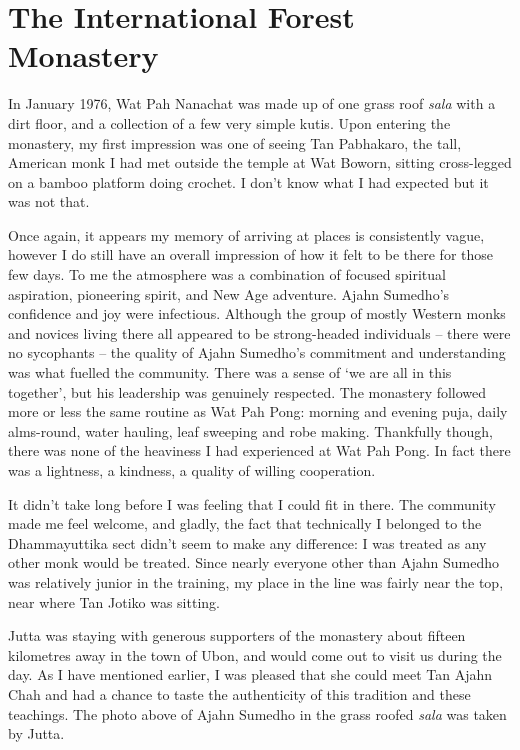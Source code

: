 \chapter{The International Forest Monastery}

In January 1976, Wat Pah Nanachat was made up of one grass roof
\emph{sala} with a dirt floor, and a collection of a few very simple
kutis. Upon entering the monastery, my first impression was one of
seeing Tan Pabhakaro, the tall, American monk I had met outside the
temple at Wat Boworn, sitting cross-legged on a bamboo platform doing
crochet. I don't know what I had expected but it was not that.

Once again, it appears my memory of arriving at places is consistently
vague, however I do still have an overall impression of how it felt to
be there for those few days. To me the atmosphere was a combination of
focused spiritual aspiration, pioneering spirit, and New Age adventure.
Ajahn Sumedho's confidence and joy were infectious. Although the group
of mostly Western monks and novices living there all appeared to be
strong-headed individuals -- there were no sycophants -- the quality of
Ajahn Sumedho's commitment and understanding was what fuelled the
community. There was a sense of `we are all in this together', but his
leadership was genuinely respected. The monastery followed more or less
the same routine as Wat Pah Pong: morning and evening puja, daily
alms-round, water hauling, leaf sweeping and robe making. Thankfully
though, there was none of the heaviness I had experienced at Wat Pah
Pong. In fact there was a lightness, a kindness, a quality of willing
cooperation.


It didn't take long before I was feeling that I could fit in there. The
community made me feel welcome, and gladly, the fact that technically I
belonged to the Dhammayuttika sect didn't seem to make any difference: I
was treated as any other monk would be treated. Since nearly everyone
other than Ajahn Sumedho was relatively junior in the training, my place
in the line was fairly near the top, near where Tan Jotiko was sitting.

Jutta was staying with generous supporters of the monastery about
fifteen kilometres away in the town of Ubon, and would come out to visit
us during the day. As I have mentioned earlier, I was pleased that she
could meet Tan Ajahn Chah and had a chance to taste the authenticity of
this tradition and these teachings. The photo above of Ajahn Sumedho in
the grass roofed \emph{sala} was taken by Jutta.

